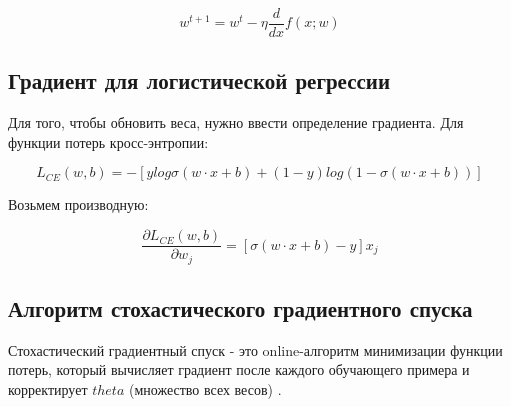 \documentclass[a4paper,12pt,preview]{report} %
\begin{document}
	\begin{equation}
	w^{t+1} = w^t - \eta \dfrac{d}{dx} f(x;w)
	\end{equation}
	
	\subsection{Градиент для логистической регрессии}
	
	Для того, чтобы обновить веса, нужно ввести определение градиента. Для функции потерь кросс-энтропии:
	
	\begin{equation}
	L_{CE}(w, b) = -[y log \sigma(w \cdot x + b) + (1 - y) log(1 - \sigma(w \cdot x + b))]
	\end{equation}
	
	Возьмем производную:
	
	
	\begin{equation}
	\dfrac{\partial L_{CE}(w,b)}{\partial w_j} = [\sigma (w \cdot x + b) - y] x_j
	\end{equation}
	
	\subsection{Алгоритм стохастического градиентного спуска}
	
	Стохастический градиентный спуск - это online-алгоритм минимизации функции потерь, который вычисляет градиент после каждого обучающего примера и корректирует $theta$ (множество всех весов) \cite{19}.
	\\
	\noindent{}
\end{document}
